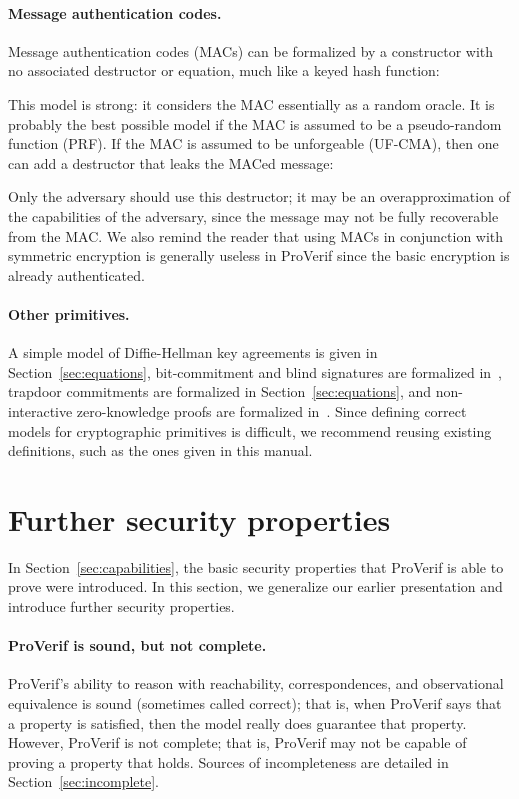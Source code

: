 \documentclass{book}
\begin{document}
\paragraph{Message authentication codes.}
Message authentication codes (MACs) can be formalized by a constructor with no associated destructor or equation, much like a keyed hash function:

This model is strong: it considers the MAC essentially as a random oracle. It is probably the best possible model if the MAC is assumed to be a pseudo-random function (PRF). If the MAC is assumed to be unforgeable (UF-CMA), then one can add a destructor that leaks the MACed message:

Only the adversary should use this destructor; it may be an overapproximation of the capabilities of the adversary, since the message may not be fully recoverable from the MAC.
We also remind the reader that using MACs in conjunction with symmetric encryption is generally useless in ProVerif since the basic encryption is already authenticated.


\paragraph{Other primitives.} A simple model of Diffie-Hellman key agreements is given in Section~\ref{sec:equations}, bit-commitment and blind signatures are formalized in~\cite{Kremer05,DKR09}, trapdoor commitments are formalized in Section~\ref{sec:equations}, and non-interactive zero-knowledge proofs are formalized in~\cite{Backes07c}.
Since defining correct models for cryptographic primitives is difficult, we recommend reusing existing definitions, such as the ones given in this manual.

\section{Further security properties}\label{sec:advCap}

In Section~\ref{sec:capabilities}, the basic security properties that ProVerif is able to prove were introduced. In this section, we generalize our earlier presentation and introduce further security properties.

\paragraph{ProVerif is sound, but not complete.} ProVerif's ability to reason with reachability, correspondences, and observational equivalence is sound (sometimes called correct); that is, when ProVerif says that a property is satisfied, then the model really does guarantee that property. However, ProVerif is not complete; that is, ProVerif may not be capable of proving a property that holds. Sources of incompleteness are detailed in Section~\ref{sec:incomplete}.
\end{document}
